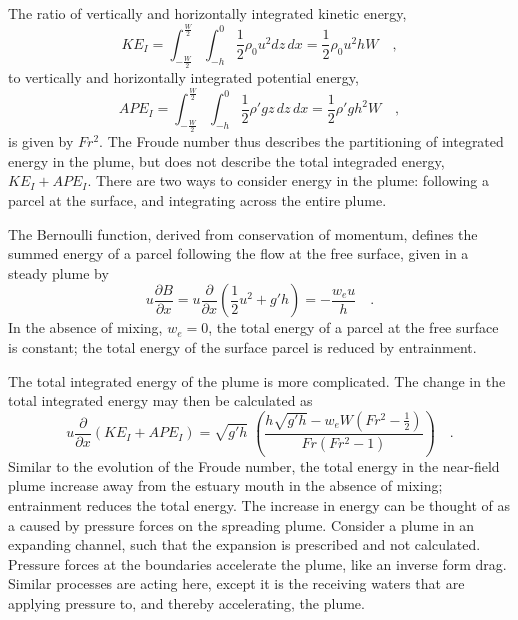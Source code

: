 \documentclass[12pt]{article}
\begin{document}
{The ratio of vertically and horizontally integrated kinetic energy, 
\begin{equation}
    KE_I = \int_{-\frac{W}{2}}^{\frac{W}{2}} \int_{-h}^{0} \frac{1}{2} \rho_0 u^2 dz \, dx = \frac{1}{2} \rho_0 u^2 h W \quad ,
\end{equation} 
to vertically and horizontally integrated potential energy, 
\begin{equation}
    APE_I = \int_{-\frac{W}{2}}^{\frac{W}{2}} \int_{-h}^{0} \frac{1}{2} \rho' g z\, dz \,dx = \frac{1}{2} \rho' g h^2 W \quad ,
\end{equation}
is given by $Fr^2$. The Froude number thus describes the partitioning of integrated energy in the plume, but does not describe the total integraded energy, $KE_I + APE_I$. There are two ways to consider energy in the plume: following a parcel at the surface, and integrating across the entire plume. 

The Bernoulli function, derived from conservation of momentum, defines the summed energy of a parcel following the flow at the free surface, given in a steady plume by
\begin{equation}
    u \frac{\partial B}{\partial x} = u \frac{\partial }{\partial x}\left( \frac{1}{2} u^2 + g' h\right) = -\frac{w_e u}{h} \quad .
\end{equation}
In the absence of mixing, $w_e = 0$, the total energy of a parcel at the free surface is constant; the total energy of the surface parcel is reduced by entrainment. 

The total integrated energy of the plume is more complicated. The change in the total integrated energy may then be calculated as
\begin{equation}
    u \frac{\partial}{\partial x} \left( KE_I + APE_I \right) = \sqrt{g' h}\; \left( \frac{h \sqrt{g' h} - w_e W (Fr^2 - \frac{1}{2})}{Fr(Fr^2 - 1)}\right) \quad .
\end{equation}
Similar to the evolution of the Froude number, the total energy in the near-field plume increase away from the estuary mouth in the absence of mixing; entrainment reduces the total energy. The increase in energy can be thought of as a caused by pressure forces on the spreading plume. Consider a plume in an expanding channel, such that the expansion is prescribed and not calculated. Pressure forces at the boundaries accelerate the plume, like an inverse form drag. Similar processes are acting here, except it is the receiving waters that are applying pressure to, and thereby accelerating, the plume. 

}
\end{document}
